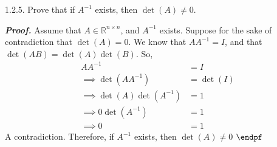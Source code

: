 \documentclass{report}
\begin{document}


    \bigbreak \noindent 
    \begin{mdframed}
        1.2.5. Prove that if $A^{-1}$ exists, then $\det(A) \ne 0$.
    \end{mdframed}
    \bigbreak \noindent 
    \textbf{\textit{Proof.}} Assume that $A\in \mathbb{R}^{n\times n}$, and $A^{-1}$ exists.
    \bigbreak \noindent 
    Suppose for the sake of contradiction that $\det(A) = 0$. We know that $AA^{-1} = I$, and that $\det(AB) = \det(A)\det(B)$. So,
    \begin{align*}
        AA^{-1} &= I \\
        \implies \det(AA^{-1}) &= \det(I) \\
        \implies \det(A)\det(A^{-1}) &= 1 \\
        \implies 0\det(A^{-1}) &= 1 \\
        \implies 0 &= 1
    \end{align*}
    A contradiction. Therefore, if $A^{-1}$ exists, then $\det(A) \ne 0$ $\endpf$
\end{document}
